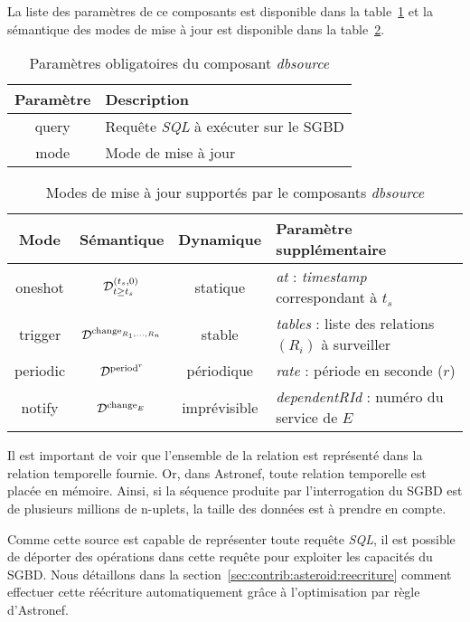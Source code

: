 La liste des paramètres de ce composants est disponible dans la table~\ref{tab:contrib:asteroid:dbsource} et la sémantique des modes de mise à jour est disponible dans la table~\ref{tab:contrib:asteroid:dbsource:modes}.
\begin{table}[ht]
    \centering
    \begin{tabular}{cl}
        Paramètre & Description \\ \midrule
        query & Requête \textit{SQL} à exécuter sur le SGBD \\
        mode & Mode de mise à jour
    \end{tabular}
    \caption{Paramètres obligatoires du composant \textit{dbsource}}\label{tab:contrib:asteroid:dbsource}
\end{table}
\begin{table}[ht]
    \centering
    \begin{tabular}{cccl}
        Mode & Sémantique & Dynamique & Paramètre supplémentaire \\ \midrule
        oneshot & $\mathcal{D}^{(t_s,0)}_{t\geq t_s}$ & statique & \textit{at} : \textit{timestamp} correspondant à $t_s$\\
        trigger & $\mathcal{D}^{\mathrm{change}_{R_1,...,R_n}}$ & stable & \textit{tables} : liste des relations $(R_i)$ à surveiller \\
        periodic & $\mathcal{D}^{\mathrm{period}^{r}}$ & périodique & \textit{rate} : période en seconde ($r$)\\
        notify & $\mathcal{D}^{\mathrm{change}_{E}}$ & imprévisible & \textit{dependentRId} : numéro du service de $E$
    \end{tabular}
    \caption{Modes de mise à jour supportés par le composants \textit{dbsource}}\label{tab:contrib:asteroid:dbsource:modes}
\end{table}

Il est important de voir que l'ensemble de la relation est représenté dans la relation temporelle fournie. Or, dans Astronef, toute relation temporelle est placée en mémoire. Ainsi, si la séquence produite par l'interrogation du SGBD est de plusieurs millions de n-uplets, la taille des données est à prendre en compte. 

Comme cette source est capable de représenter toute requête \textit{SQL}, il est possible de déporter des opérations dans cette requête pour exploiter les capacités du SGBD. Nous détaillons dans la section~\ref{sec:contrib:asteroid:reecriture} comment effectuer cette réécriture automatiquement grâce à l'optimisation par règle d'Astronef.

